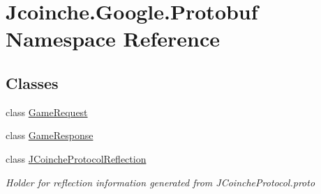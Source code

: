 \hypertarget{namespace_jcoinche_1_1_google_1_1_protobuf}{}\section{Jcoinche.\+Google.\+Protobuf Namespace Reference}
\label{namespace_jcoinche_1_1_google_1_1_protobuf}
\subsection*{Classes}
\begin{DoxyCompactItemize}
\item 
class \hyperlink{class_jcoinche_1_1_google_1_1_protobuf_1_1_game_request}{Game\+Request}
\item 
class \hyperlink{class_jcoinche_1_1_google_1_1_protobuf_1_1_game_response}{Game\+Response}
\item 
class \hyperlink{class_jcoinche_1_1_google_1_1_protobuf_1_1_j_coinche_protocol_reflection}{J\+Coinche\+Protocol\+Reflection}
\begin{DoxyCompactList}\small\item\em Holder for reflection information generated from J\+Coinche\+Protocol.\+proto\end{DoxyCompactList}\end{DoxyCompactItemize}
